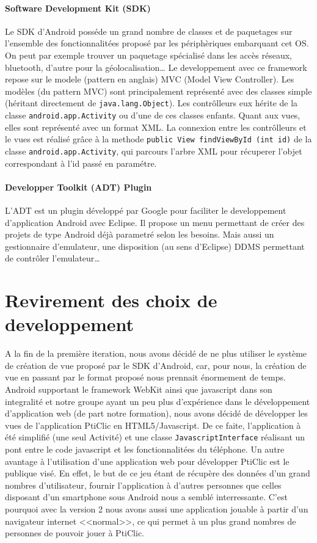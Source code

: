 \documentclass[a4paper,11pt,french]{article}
\def\android{Android\texttrademark{}}
\begin{document}
\paragraph{Software Development Kit (SDK)}
Le SDK d'\android{} posséde un grand nombre de classes et de paquetages sur l'ensemble des fonctionnalitées proposé par les périphèriques embarquant cet OS. On peut par exemple trouver un paquetage spécialisé dans les accès réseaux, bluetooth, d'autre pour la géolocalisation\dots{} Le developpement avec ce framework repose sur le modele (pattern en anglais) MVC (Model View Controller). Les modèles (du pattern MVC) sont principalement représenté avec des classes simple (héritant directement de \verb!java.lang.Object!). Les contrôlleurs eux hérite de la classe \verb!android.app.Activity! ou d'une de ces classes enfants. Quant aux vues, elles sont représenté avec un format XML.
La connexion entre les contrôlleurs et le vues est réalisé grâce à la methode \verb!public View findViewById (int id)! de la classe \verb!android.app.Activity!, qui parcours l'arbre XML pour récuperer l'objet correspondant à l'id passé en paramétre.

\paragraph{Developper Toolkit (ADT) Plugin}
L'ADT est un plugin développé par Google pour faciliter le developpement d'application \android{} avec Eclipse. Il propose un menu permettant de créer des projets de type \android{} déjà parametré selon les besoins. Mais aussi un gestionnaire d'emulateur, une disposition (au sens d'Eclipse) DDMS permettant de contrôler l'emulateur\dots{}

\section{Revirement des choix de developpement} %
A la fin de la première iteration, nous avons décidé de ne plus utiliser le système de création de vue proposé par le SDK d'\android{}, car, pour nous, la création de vue en passant par le format proposé nous prennait énormement de temps. \android{} supportant le framework WebKit ainsi que javascript dans son integralité et notre groupe ayant un peu plus d'expérience dans le développement d'application web (de part notre formation), nous avons décidé de développer les vues de l'application PtiClic en HTML5/Javascript. De ce faite, l'application à été simplifié (une seul Activité) et une classe \verb!JavascriptInterface! réalisant un pont entre le code javascript et les fonctionnalitées du téléphone.
Un autre avantage à l'utilisation d'une application web pour développer PtiClic est le publique visé. En effet, le but de ce jeu étant de récupère des données d'un grand nombres d'utilisateur, fournir l'application à d'autres personnes que celles disposant d'un smartphone sous \android{} nous a semblé interressante. C'est pourquoi avec la version 2 nous avons aussi une application jouable à partir d'un navigateur internet <<normal>>, ce qui permet à un plus grand nombres de personnes de pouvoir jouer à PtiClic.
\end{document}
